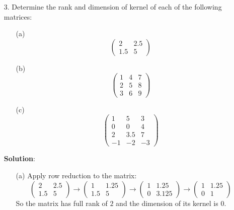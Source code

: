\documentclass{article}
\begin{document}
\begin{enumerate}
    
    \item[3. ] Determine the rank and dimension of kernel of each of the following matrices:
        \begin{enumerate}
            \item[(a)] $$ \begin{pmatrix}2 &2.5 \\ 1.5 &5\end{pmatrix} $$
            \item[(b)] $$ \begin{pmatrix}1 &4 &7 \\ 2 &5 &8 \\ 3 &6 &9 \end{pmatrix} $$
            \item[(c)] $$ \begin{pmatrix}1 &5 &3 \\ 0 &0 &4 \\ 2 &3.5 &7 \\ -1 &-2 &-3\end{pmatrix} $$
        \end{enumerate}
        
        \textbf{Solution}:
        \begin{enumerate}
            \item[(a)] Apply row reduction to the matrix:
            $$ \begin{pmatrix}2 &2.5 \\ 1.5 &5\end{pmatrix} \rightarrow \begin{pmatrix}1 &1.25 \\ 1.5 &5\end{pmatrix} \rightarrow \begin{pmatrix}1 &1.25 \\ 0 &3.125\end{pmatrix} \rightarrow \begin{pmatrix}1 &1.25 \\ 0 &1\end{pmatrix}$$
            So the matrix has full rank of $2$ and the dimension of its kernel is $0$.
            

\end{enumerate}
\end{enumerate}
\end{document}

